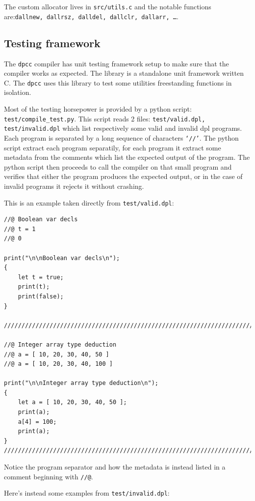 \documentclass[a4paper]{article}
\newcommand{\urlref}[3][blue]{\href{#2}{\color{#1}{#3}}}%
\begin{document}
The custom allocator lives in \texttt{src/utils.c} and the notable functions are:\texttt{dallnew, dallrsz, dalldel, dallclr, dallarr, \dots}.


\subsection{Testing framework}

The \texttt{dpcc} compiler has unit testing framework setup to make sure that the compiler works as expected.
The library \urlref{https://github.com/ThrowTheSwitch/Unity}{Unity} is a standalone unit framework written C. The
\texttt{dpcc} uses this library to test some utilities freestanding functions in isolation.

Most of the testing horsepower is provided by a python script: \texttt{test/compile\_test.py}.
This script reads 2 files: \texttt{test/valid.dpl, test/invalid.dpl} which list respectively some valid and invalid dpl programs.
Each program is separated by a long sequence of characters \texttt{`//'}. The python script extract each program
separatily, for each program it extract some metadata from the comments which list the expected output of the program.
The python script then proceeds to call the compiler on that small program and verifies that either the program
produces the expected output, or in the case of invalid programs it rejects it without crashing.


This is an example taken directly from \texttt{test/valid.dpl}:

\begin{lstlisting}[language=DPL]
//@ Boolean var decls
//@ t = 1
//@ 0

print("\n\nBoolean var decls\n");
{
    let t = true;
    print(t);
    print(false);
}

///////////////////////////////////////////////////////////////////////////////

//@ Integer array type deduction
//@ a = [ 10, 20, 30, 40, 50 ]
//@ a = [ 10, 20, 30, 40, 100 ]

print("\n\nInteger array type deduction\n");
{
    let a = [ 10, 20, 30, 40, 50 ];
    print(a);
    a[4] = 100;
    print(a);
}
///////////////////////////////////////////////////////////////////////////////
\end{lstlisting}

Notice the program separator and how the metadata is instead listed in a comment beginning with \texttt{//@}.

Here's instead some examples from \texttt{test/invalid.dpl}:
\end{document}
